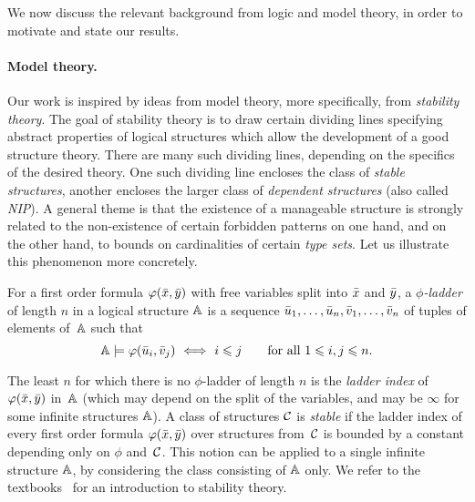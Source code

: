 We now discuss the relevant background from logic and model theory, in order to motivate and state our results.



\paragraph{Model theory.}Our work is inspired by ideas from model theory,  more specifically, from \emph{stability theory}.
  The goal of {stability theory}
  is to draw certain dividing lines
  specifying abstract properties of 
  logical structures which allow the development 
  of a good structure theory. There are many such dividing lines, depending on the specifics of the desired theory. One such dividing line encloses the class of \emph{stable structures}, 
  another encloses the larger class of \emph{dependent structures} (also called \emph{NIP}). 
  A general theme is that the existence of a manageable structure is strongly related to
  the non-existence of certain forbidden patterns on one hand,
and on the other hand, to bounds on cardinalities
of certain \emph{type sets}.  
  Let us illustrate this phenomenon more concretely.

For a first order formula 
$\varphi(\bar{x},\bar{y})$ 
 with free variables
split into  $\bar{x}$ and $\bar{y}$,
a \emph{$\phi$-ladder}
of length $n$ in a logical structure $\mathbb A$ is a sequence $\bar{u}_1,\ldots, \bar{u}_{n},
\bar{v}_1,\ldots, \bar{v}_{n}$ of tuples of elements of~$\mathbb A$ 
such that 
\[\strA\models\phi(\tup{u}_i,\tup{v}_j)\ \Longleftrightarrow\ i\leq j\qquad \text {for all $1\leq i,j\le n$.}\]

The least  $n$ for which 
there is no $\phi$-ladder of length $n$ is 
the \emph{ladder index} 
of $\varphi(\bar{x},\bar{y})$ in~$\mathbb A$ (which may depend on the split of the
variables, and may be $\infty$ for some infinite structures $\mathbb A$). A class of structures $\mathcal{C}$ is \emph{stable} if
the ladder index of every first order formula $\varphi(\bar{x},\bar{y})$ over
structures from~$\mathcal{C}$ is bounded by a constant depending only on $\phi$ 
and~$\mathcal{C}$. This notion can be applied to a single infinite structure $\mathbb A$, by considering the class consisting of $\mathbb A$ only.
We refer to the textbooks~\cite{pillay,tent2012course} for an introduction to stability theory.


